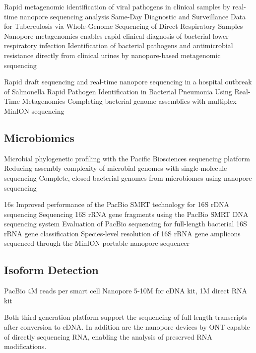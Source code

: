 Rapid metagenomic identification of viral pathogens in clinical samples by real-time nanopore sequencing analysis \cite{Greninger2015}
Same-Day Diagnostic and Surveillance Data for Tuberculosis via Whole-Genome Sequencing of Direct Respiratory Samples \cite{Votintseva2017}
Nanopore metagenomics enables rapid clinical diagnosis of bacterial lower respiratory infection \cite{Charalampous2019}
Identification of bacterial pathogens and antimicrobial resistance directly from clinical urines by nanopore-based metagenomic sequencing \cite{Schmidt2017}

Rapid draft sequencing and real-time nanopore sequencing in a hospital outbreak of Salmonella \cite{Quick2015}
Rapid Pathogen Identification in Bacterial Pneumonia Using Real-Time Metagenomics \cite{Pendleton2017}
Completing bacterial genome assemblies with multiplex MinION sequencing \cite{Wick2017}




\subsection{Microbiomics}
\label{subsec:state_of_art:metagenomics}

Microbial phylogenetic profiling with the Pacific Biosciences sequencing platform \cite{Fichot2013}
Reducing assembly complexity of microbial genomes with single-molecule sequencing \cite{Koren2013}
Complete, closed bacterial genomes from microbiomes using nanopore sequencing \cite{Moss2020}

16s
Improved performance of the PacBio SMRT technology for 16S rDNA sequencing \cite{Mosher2014}
Sequencing 16S rRNA gene fragments using the PacBio SMRT DNA sequencing system \cite{Schloss2016}
Evaluation of PacBio sequencing for full-length bacterial 16S rRNA gene classification \cite{Wagner2016}
Species-level resolution of 16S rRNA gene amplicons sequenced through the MinION portable nanopore sequencer \cite{Benitez-Paez2016}




\subsection{Isoform Detection}
\label{subsec:state_of_art:isoform}

PacBio 4M reads per smart cell
Nanopore 5-10M for cDNA kit, 1M direct RNA kit

Both third-generation platform support the sequencing of full-length transcripts after conversion to cDNA. 
In addition are the nanopore devices by ONT capable of directly sequencing RNA, enabling the analysis of preserved RNA modifications.

